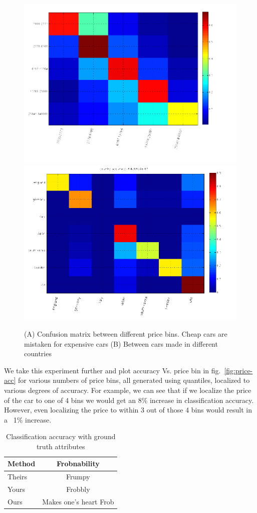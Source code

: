 \documentclass[10pt,twocolumn,letterpaper]{article}
\begin{document}
\begin{figure}[t]
\begin{center}
   \includegraphics[width=0.4\linewidth]{img/confusion_price5.png}
   \hspace{0.1\linewidth}
   \includegraphics[width=0.4\linewidth]{img/confusion_country.png}
\end{center}
   \caption{(A) Confusion matrix between different price bins. Cheap cars are mistaken for expensive cars (B) Between cars made in different countries}
\label{fig:fg-confusion}
\end{figure}

We take this experiment further and plot accuracy Vs. price bin in fig.~\ref{fig:price-acc} for various numbers of price bins, all generated using quantiles, localized to various degrees of accuracy. For example, we can see that if we localize
 the price of the car to one of 4 bins we would get an 8\% increase in classification accuracy. However, even localizing 
the price to within 3 out of those 4 bins would result in a ~1\% increase.


\begin{table}
\begin{center}
\begin{tabular}{|l|c|}
\hline
Method & Frobnability \\
\hline\hline
Theirs & Frumpy \\
Yours & Frobbly \\
Ours & Makes one's heart Frob\\
\hline
\end{tabular}
\end{center}
\caption{Classification accuracy with ground truth attributes}
\label{table:car-att}
\end{table}
\end{document}
